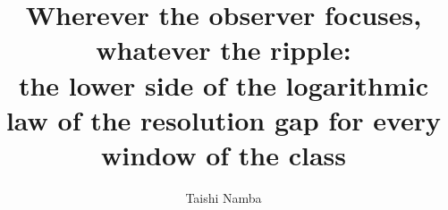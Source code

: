 \documentclass[aps,pre,twocolumn,superscriptaddress,nofootinbib]{revtex4-2}
\begin{document}
\title{\texorpdfstring{Wherever the observer focuses, whatever the ripple:\\ the lower side of the logarithmic law of the resolution gap for every window of the class}{Wherever the observer focuses, whatever the ripple: the lower side of the logarithmic law of the resolution gap for every window of the class}}

\author{Taishi Namba}

\begin{abstract}

\end{abstract}

\maketitle











\appendix








\end{document}
